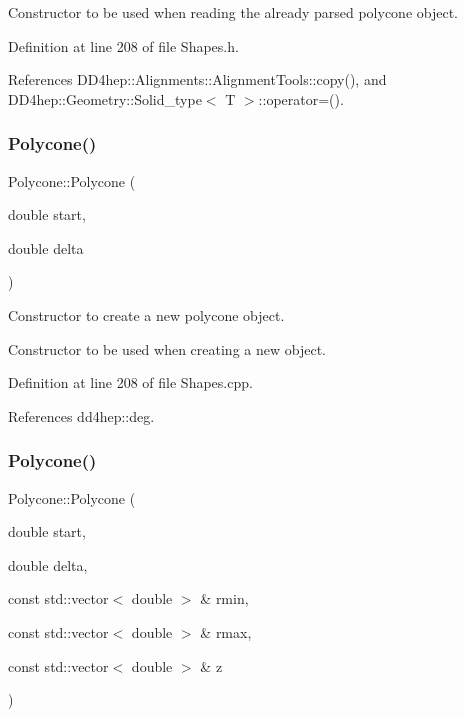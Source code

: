 Constructor to be used when reading the already parsed polycone object. 



Definition at line 208 of file Shapes.\+h.



References D\+D4hep\+::\+Alignments\+::\+Alignment\+Tools\+::copy(), and D\+D4hep\+::\+Geometry\+::\+Solid\+\_\+type$<$ T $>$\+::operator=().

\hypertarget{class_d_d4hep_1_1_geometry_1_1_polycone_aee9015113e47313a9b382ed7ce0ec63b}{}\label{class_d_d4hep_1_1_geometry_1_1_polycone_aee9015113e47313a9b382ed7ce0ec63b} 
\subsubsection{\texorpdfstring{Polycone()}{Polycone()}\hspace{0.1cm}{\footnotesize\ttfamily [5/6]}}
{\footnotesize\ttfamily Polycone\+::\+Polycone (\begin{DoxyParamCaption}\item[{double}]{start,  }\item[{double}]{delta }\end{DoxyParamCaption})}



Constructor to create a new polycone object. 

Constructor to be used when creating a new object. 

Definition at line 208 of file Shapes.\+cpp.



References dd4hep\+::deg.

\hypertarget{class_d_d4hep_1_1_geometry_1_1_polycone_aaa4e5a89826cbdbf7c1162175ee27c0f}{}\label{class_d_d4hep_1_1_geometry_1_1_polycone_aaa4e5a89826cbdbf7c1162175ee27c0f} 
\subsubsection{\texorpdfstring{Polycone()}{Polycone()}\hspace{0.1cm}{\footnotesize\ttfamily [6/6]}}
{\footnotesize\ttfamily Polycone\+::\+Polycone (\begin{DoxyParamCaption}\item[{double}]{start,  }\item[{double}]{delta,  }\item[{const std\+::vector$<$ double $>$ \&}]{rmin,  }\item[{const std\+::vector$<$ double $>$ \&}]{rmax,  }\item[{const std\+::vector$<$ double $>$ \&}]{z }\end{DoxyParamCaption})}



